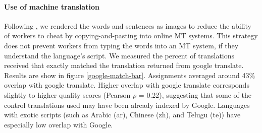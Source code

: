 \documentclass[11pt]{article}
\begin{document}
\paragraph{Use of machine translation}
Following , we rendered the words and sentences as images to reduce the ability of workers to cheat by copying-and-pasting into online MT systems.  This strategy does not prevent workers from typing the words into an MT system, if they understand the language's script. We measured the percent of translations received that exactly matched the translation returned from google translate. Results are show in figure \ref{google-match-bar}. Assignments averaged around 43\% overlap with google translate. Higher overlap with google translate corresponds slightly to higher quality scores (Pearson $\rho$ = 0.22), suggesting that some of the control translations used may have been already indexed by Google. Languages with exotic scripts (such as Arabic (ar), Chinese (zh), and Telugu (te)) have especially low overlap with Google. 
\end{document}
